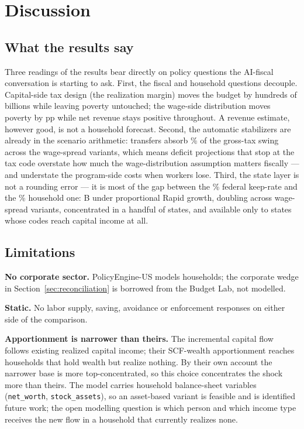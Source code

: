 \section{Discussion}\label{sec:discussion}

\subsection{What the results say}

Three readings of the results bear directly on policy questions the AI-fiscal
conversation is starting to ask. First, the fiscal and household questions
decouple. Capital-side tax design (the realization margin) moves the budget
by hundreds of billions while leaving poverty untouched; the wage-side
distribution moves poverty by \genRapidPovSpanPp pp while net revenue stays
positive throughout. A revenue estimate, however good, is not a household
forecast. Second, the automatic stabilizers are already in the scenario
arithmetic: transfers absorb \genTransferAbsorbPct\% of the gross-tax swing
across the wage-spread variants, which means deficit projections that stop
at the tax code overstate how much the wage-distribution assumption matters
fiscally --- and understate the program-side costs when workers lose. Third,
the state layer is not a rounding error --- it is most of the gap between
the \genKeptMatchedRapidPct\% federal keep-rate and the
\genKeptHouseholdRapidPct\% household one: \genRapidPropState B under
proportional Rapid growth, doubling across wage-spread variants,
concentrated in a handful of states, and available only to states whose
codes reach capital income at all.

\subsection{Limitations}

\textbf{No corporate sector.} PolicyEngine-US models households; the
corporate wedge in Section~\ref{sec:reconciliation} is borrowed from the
Budget Lab, not modelled.

\textbf{Static.} No labor supply, saving, avoidance or enforcement
responses on either side of the comparison.

\textbf{Apportionment is narrower than theirs.} The incremental capital flow
follows existing realized capital income; their SCF-wealth apportionment
reaches households that hold wealth but realize nothing. By their own
account the narrower base is more top-concentrated, so this choice
concentrates the shock more than theirs. The model carries household
balance-sheet variables (\texttt{net\_worth}, \texttt{stock\_assets}), so an
asset-based variant is feasible and is identified future work; the open
modelling question is which person and which income type receives the new
flow in a household that currently realizes none.

